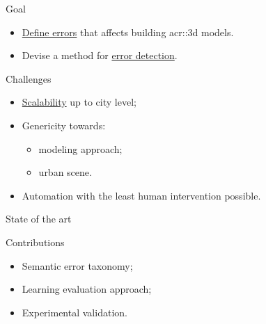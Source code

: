 \documentclass[10pt]{beamer}
\begin{document}
            \begin{frame}{Goal}
                \begin{itemize}[label=\(\blacktriangleright\), font=\color{IGNGreen}]
                    \item<1-> \underline{Define errors} that affects building \gls{acr::3d} models.
                    \item<2-> Devise a method for \underline{error detection}.
                \end{itemize}
            \end{frame}

            \begin{frame}{Challenges}
                \begin{itemize}[label=\(\blacktriangleright\), font=\color{IGNGreen}]
                    \item<1-> \underline{Scalability} up to city level;
                    \item<2-> Genericity towards:
                        \begin{itemize}
                            \item<3-> modeling approach;
                            \item<4-> urban scene.
                        \end{itemize}
                    \item<5-> Automation with the least human intervention possible.
                \end{itemize}
            \end{frame}

        \begin{frame}{State of the art}
            \centering
            
        \end{frame}

        \begin{frame}{Contributions}
            \begin{itemize}[label=\(\blacktriangleright\), font=\color{IGNGreen}, itemsep=2em]
                \item<1-> Semantic error taxonomy;
                \item<2-> Learning evaluation approach;
                \item<3-> Experimental validation.
            \end{itemize}
        \end{frame}
\end{document}
